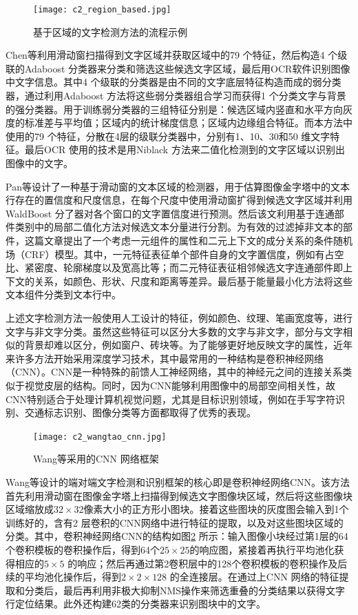     \begin{figure}[!h]
    \centering
    \texttt{[image: c2\_region\_based.jpg]}
    \caption{基于区域的文字检测方法的流程示例}
    \label{fig.c2_region_based}
    \end{figure}

    Chen等\cite{Chen2004Detecting}利用滑动窗扫描得到文字区域并获取区域中的79 个特征，然后构造4 个级联的Adaboost 分类器来分类和筛选这些候选文字区域，最后用OCR软件识别图像中文字信息。其中4 个级联的分类器是由不同的文字底层特征构造而成的弱分类器，通过利用Adaboost 方法将这些弱分类器组合学习而获得1 个分类文字与背景的强分类器。用于训练弱分类器的三组特征分别是：候选区域内竖直和水平方向灰度的标准差与平均值；区域内的统计梯度信息；区域内边缘组合特征。而本方法中使用的79 个特征，分散在4层的级联分类器中，分别有1、10、30和50 维文字特征。最后OCR 使用的技术是用Niblack 方法来二值化检测到的文字区域以识别出图像中的文字。

    Pan等\cite{Pan2011A}设计了一种基于滑动窗的文本区域的检测器，用于估算图像金字塔中的文本行存在的置信度和尺度信息，在每个尺度中使用滑动窗扩得到候选文字区域并利用WaldBoost 分了器对各个窗口的文字置信度进行预测。然后该文利用基于连通部件类别中的局部二值化方法对候选文本分量进行分割。为有效的过滤掉非文本的部件，这篇文章提出了一个考虑一元组件的属性和二元上下文的成分关系的条件随机场（CRF）模型。其中，一元特征表征单个部件自身的文字置信度，例如有占空比、紧密度、轮廓梯度以及宽高比等；而二元特征表征相邻候选文字连通部件即上下文的关系，如颜色、形状、尺度和距离等差异。最后基于能量最小化方法将这些文本组件分类到文本行中。

    上述文字检测方法一般使用人工设计的特征，例如颜色、纹理、笔画宽度等，进行文字与非文字分类。虽然这些特征可以区分大多数的文字与非文字，部分与文字相似的背景却难以区分，例如窗户、砖块等。为了能够更好地反映文字的属性，近年来许多方法开始采用深度学习技术，其中最常用的一种结构是卷积神经网络（CNN）。CNN是一种特殊的前馈人工神经网络，其中的神经元之间的连接关系类似于视觉皮层的结构。同时，因为CNN能够利用图像中的局部空间相关性，故CNN特别适合于处理计算机视觉问题，尤其是目标识别领域，例如在手写字符识别、交通标志识别、图像分类等方面都取得了优秀的表现。

    \begin{figure}[!h]
    \centering
    \texttt{[image: c2\_wangtao\_cnn.jpg]}
    \caption{Wang等\cite{Wang2012End}采用的CNN 网络框架}
    \label{fig.c2_wangtao_cnn}
    \end{figure}

    Wang等\cite{Wang2012End}设计的端对端文字检测和识别框架的核心即是卷积神经网络CNN。该方法首先利用滑动窗在图像金字塔上扫描得到候选文字图像块区域，然后将这些图像块区域缩放成$32\times32$像素大小的正方形小图块。接着这些图块的灰度图会输入到1个训练好的，含有2 层卷积的CNN网络中进行特征的提取，以及对这些图块区域的分类。其中，卷积神经网络CNN的结构如图\ref{fig.c2_wangtao_cnn} 所示：输入图像小块经过第1层的64个卷积模板的卷积操作后，得到64个$25\times25$的响应图，紧接着再执行平均池化获得相应的$5\times5$ 的响应；然后再通过第2卷积层中的128个卷积模板的卷积操作及后续的平均池化操作后，得到$2\times2\times128$ 的全连接层。在通过上CNN 网络的特征提取和分类后，最后再利用非极大抑制NMS操作来筛选重叠的分类结果以获得文字行定位结果。此外还构建62类的分类器来识别图块中的文字。

